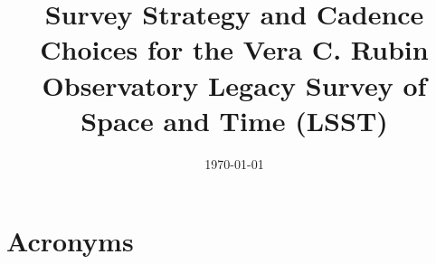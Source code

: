 \documentclass[modern]{aastex62}
\begin{document}


\date{\today}
\title{Survey Strategy and Cadence Choices for the Vera C. Rubin Observatory Legacy Survey of Space and Time (LSST)}



\tableofcontents

\clearpage


\clearpage

\clearpage

\clearpage

\clearpage

\clearpage

\clearpage

\clearpage

%

\clearpage



\clearpage
\section{Acronyms} \label{sec:acronyms}

\end{document}
